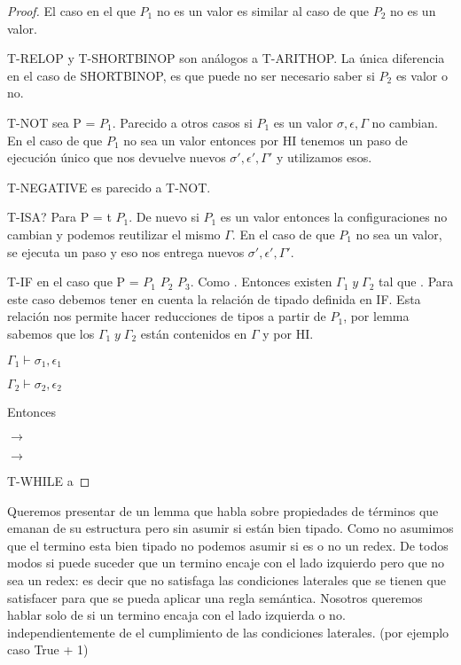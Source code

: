 \begin{proof}
El caso en el que $P_{1}$ no es un valor es similar al caso de que $P_{2}$ no es un valor.

T-RELOP y T-SHORTBINOP son análogos a T-ARITHOP. La única diferencia en el caso de SHORTBINOP, es que puede no ser necesario saber si $P_{2}$ es valor o no.

T-NOT  sea P =  $P_{1}$. Parecido a otros casos si $P_{1}$ es un valor $\sigma, \epsilon, \Gamma$ no cambian.
En el caso de que $P_{1}$ no sea un valor entonces por HI tenemos un paso de ejecución único que nos devuelve nuevos $\sigma', \epsilon', \Gamma'$ y utilizamos esos.

T-NEGATIVE es parecido a T-NOT.

T-ISA? Para P =  t $P_{1}$. De nuevo si $P_{1}$ es un valor entonces la configuraciones no cambian y podemos reutilizar el mismo $\Gamma$.
En el caso de que $P_{1}$ no sea un valor, se ejecuta un paso y eso nos entrega nuevos $\sigma', \epsilon', \Gamma'$.

T-IF en el caso que P =  $P_{1}$  $P_{2}$  $P_{3}$. Como .
Entonces existen $\Gamma_{1} \; y \; \Gamma_{2}$ tal que .
 Para este caso debemos tener en cuenta la relación de tipado
definida en IF. Esta relación nos permite hacer reducciones de tipos a partir de $P_{1}$, por lemma sabemos que los $\Gamma_{1} \; y \; \Gamma_{2}$
están contenidos en $\Gamma$ y por HI.

$\Gamma_{1} \vdash \sigma_{1}, \epsilon_{1}$

$\Gamma_{2} \vdash \sigma_{2}, \epsilon_{2}$

Entonces 

  $\rightarrow$ 

  $\rightarrow$ 

T-WHILE a

\end{proof}

Queremos presentar de un lemma que habla sobre propiedades de términos que emanan de su estructura pero sin asumir si están bien tipado.
Como no asumimos que el termino esta bien tipado no podemos asumir si es o no un redex.
De todos modos si puede suceder que un termino encaje con el lado izquierdo pero  que no sea un redex:
 es decir que no satisfaga las condiciones laterales que se tienen que satisfacer para que se pueda aplicar una regla semántica.
Nosotros queremos hablar solo de si un termino encaja con el lado izquierda o no. independientemente de el cumplimiento de las condiciones laterales.
(por ejemplo caso True + 1)

